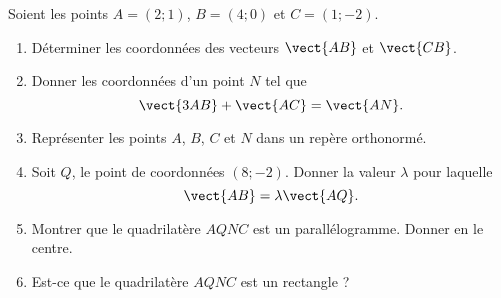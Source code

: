 
\begin{exercice}\label{exosmath-0432}

    Soient les points \( A=(2;1)\), \( B=(4;0)\) et \( C=(1;-2)\).
    \begin{enumerate}
        \item
            Déterminer les coordonnées des vecteurs \( \vect{ AB }\) et \( \vect{ CB }\). 
        \item
            Donner les coordonnées d'un point \( N\) tel que
            \begin{equation}
                \vect{ 3AB }+\vect{ AC }=\vect{ AN }.
            \end{equation}
        \item
            Représenter les points \( A\), \( B\), \( C\) et \( N\) dans un repère orthonormé.
        \item
            Soit \( Q\), le point de coordonnées \( (8;-2)\). Donner la valeur \( \lambda\) pour laquelle
            \begin{equation}
                \vect{ AB }=\lambda\vect{ AQ }.
            \end{equation}
        \item
            Montrer que le quadrilatère \( AQNC\) est un parallélogramme. Donner en le centre. 
        \item
            Est-ce que le quadrilatère \( AQNC\) est un rectangle ?
    \end{enumerate}

\end{exercice}
